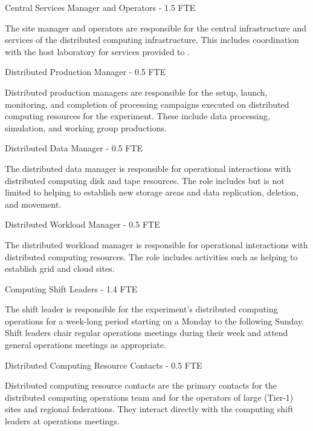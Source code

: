 \begin{description}
\item {Central Services Manager and Operators - 1.5 FTE}

The site manager and operators are responsible for the central infrastructure and services of the  distributed computing infrastructure. This includes coordination with the host laboratory for services provided to . 

\item {Distributed Production Manager - 0.5 FTE}

Distributed production managers are responsible for the setup, launch, monitoring, and %
completion of processing campaigns executed on distributed computing resources for the experiment. %
These include data processing,  simulation, and working group productions. 


\item {Distributed Data Manager - 0.5 FTE}

The distributed data manager is responsible for operational interactions with distributed computing disk and tape resources. The role includes but is not limited to helping to establish new storage areas and data replication, deletion, and movement. 

\item {Distributed Workload Manager - 0.5 FTE}

The distributed workload manager is responsible for operational interactions with distributed computing resources. The role includes activities such as helping to establish grid and cloud sites. 


\item {Computing Shift Leaders - 1.4 FTE}

The shift leader is %
responsible for the experiment's distributed computing operations for a week-long period  %
starting on a Monday to the following Sunday.  Shift leaders chair regular operations meetings during their week and attend general  operations meetings as appropriate. %

\item {Distributed Computing Resource Contacts - 0.5 FTE}

Distributed computing resource contacts are the primary contacts for the  distributed computing operations team and for the operators of large (Tier-1) sites and regional federations. They interact directly with the computing shift leaders at operations meetings. 


\end{description}
